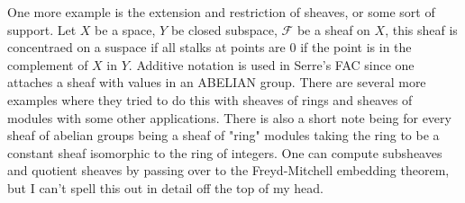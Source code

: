 \documentclass[12pt]{article}
\begin{document}
One more example is the extension and restriction of sheaves, or some sort of support. Let $X$ be a space, $Y$ be closed subspace, $\mathcal{F}$ be a sheaf on $X$, this sheaf is concentraed on a suspace if all stalks at points are $0$ if the point is in the complement of $X$ in $Y$. Additive notation is used in Serre's FAC since one attaches a sheaf with values in an ABELIAN group. There are several more examples where they tried to do this with sheaves of rings and sheaves of modules with some other applications. There is also a short note being for every sheaf of abelian groups being a sheaf of "ring" modules taking the ring to be a constant sheaf isomorphic to the ring of integers. One can compute subsheaves and quotient sheaves by passing over to the Freyd-Mitchell embedding theorem, but I can't spell this out in detail off the top of my head. 
\end{document}
